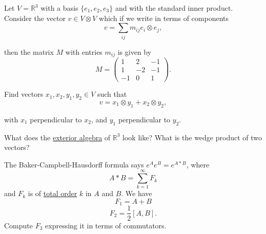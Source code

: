   \begin{exercise} 
    Let $V = \mathbb{R}^3$ with a basis $\{e_1, e_2, e_3\}$ and with the standard inner product. Consider the vector $v \in V \otimes V$ which if we write in terms of components
    \begin{equation}
      v = \sum_{ij} m_{ij}e_i \otimes e_j,
    \end{equation}
    
    then the matrix $M$ with entries $m_{ij}$ is given by
    \begin{equation}
      M = \begin{pmatrix} 1 & 2 & -1 \\ 1 & -2 & -1 \\ -1 & 0 & 1 \end{pmatrix}.
    \end{equation}
    
    Find vectors $x_1, x_2, y_1, y_2 \in V$ such that
    \begin{equation}
      v = x_1 \otimes y_1 + x_2 \otimes y_2,
    \end{equation}
    
    with $x_1$ perpendicular to $x_2$, and $y_1$ perpendicular to $y_2$.
  \end{exercise}

  \begin{exercise} 
    What does the \hyperref[alg-def:exterior-algebra]{exterior algebra} of $\mathbb{R}^3$ look like? What is the wedge product of two vectors?
  \end{exercise}

  \begin{exercise} 
    The Baker-Campbell-Hausdorff formula says $e^A e^B = e^{A*B}$, where
    \begin{equation}
      A * B = \sum_{k=1}^{\infty} F_k
    \end{equation}
    and $F_k$ is of \hyperref[st-def:total-order]{total order} $k$ in $A$ and $B$. We have
    \begin{equation}
      F_1 = A+B
    \end{equation}
    \begin{equation}
      F_2 = \frac{1}{2}[A,B].
    \end{equation}
    Compute $F_3$ expressing it in terms of commutators.
  \end{exercise}

